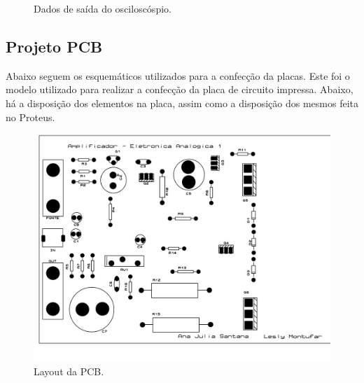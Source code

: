 \documentclass[a4paper,12pt,oneside,openany,table,xcdraw]{article}
\begin{document}
\begin{figure}[H]
\hfill
{}
\caption{Dados de saída do osciloscóspio.}
\label{ampsuperiorlayout}
\end{figure}


\subsection{Projeto PCB}
Abaixo seguem os esquemáticos utilizados para a confecção da placas.
Este foi o modelo utilizado para realizar a confecção da placa de circuito impressa. Abaixo, há a disposição dos elementos na placa, assim como a disposição dos mesmos feita no Proteus.

\begin{figure}[H]
\includegraphics[width=15cm]{ampsuperiorlayout}
\caption{Layout da PCB.}
\label{ampsuperiorlayout}
\end{figure}
\end{document}
